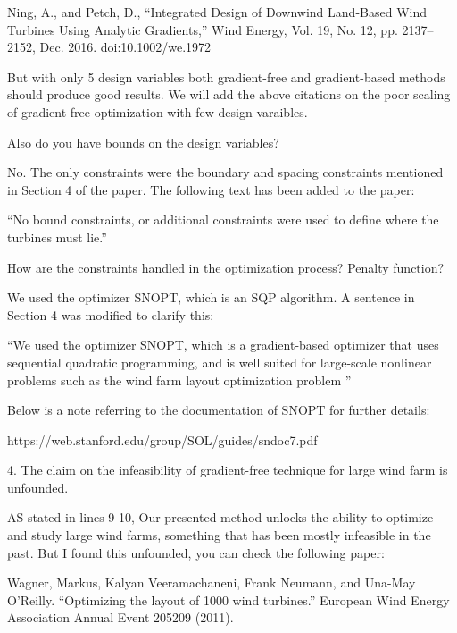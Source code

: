 \documentclass[12pt]{report}
\begin{document}
\smallskip
Ning, A., and Petch, D., “Integrated Design of Downwind Land-Based Wind Turbines Using Analytic Gradients,” Wind Energy, Vol. 19, No. 12, pp. 2137–2152, Dec. 2016. doi:10.1002/we.1972

\bigskip
But with only 5 design variables both gradient-free and gradient-based methods should produce good results. We will add the above citations on the poor scaling of gradient-free optimization with few design varaibles.

\color{black}
\bigskip

Also do you have bounds on the design variables? 

\bigskip
\color{blue}

No. The only constraints were the boundary and spacing constraints mentioned in Section 4 of the paper. The following text has been added to the paper:

\smallskip
``No bound constraints, or additional constraints were used to define where the turbines must lie.''

\color{black}
\bigskip

How are the constraints handled in the optimization process? Penalty function? 

\bigskip
\color{blue}

We used the optimizer SNOPT, which is an SQP algorithm. A sentence in Section 4 was modified to clarify this:

\smallskip
``We used the optimizer SNOPT, which is a gradient-based optimizer that uses sequential quadratic programming, and is well suited for large-scale nonlinear problems such as the wind farm layout optimization problem ''

\smallskip
Below is a note referring to the documentation of SNOPT for further details: 
\smallskip

https://web.stanford.edu/group/SOL/guides/sndoc7.pdf

\color{black}
\bigskip

4. The claim on the infeasibility of gradient-free technique for large wind farm is unfounded. 

AS stated in lines 9-10, Our presented method unlocks the ability to optimize and study large wind farms, something that has been mostly infeasible in the past. But I found this unfounded, you can check the following paper: 

Wagner, Markus, Kalyan Veeramachaneni, Frank Neumann, and Una-May O’Reilly. ``Optimizing the layout of 1000 wind turbines.'' European Wind Energy Association Annual Event 205209 (2011). 
\end{document}
